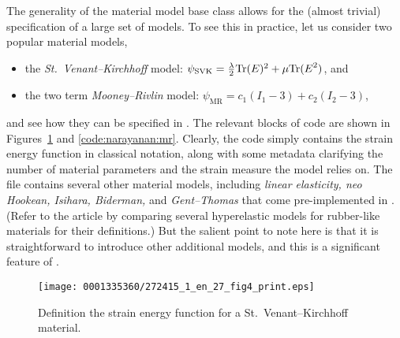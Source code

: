 The generality of the material model base class allows for the (almost
trivial) specification of a large set of models. To see this in
practice, let us consider two popular material models,
\begin{itemize}
  \item the {\em St.~Venant--Kirchhoff} model: $\psi_{\mathrm{SVK}} =
  \frac{\lambda}{2}\mathrm{Tr}(\mbox{$ E$})^{2} + \mu\mathrm{Tr}(\mbox{$ E$}^{2})$, and

  \item the two term {\em Mooney--Rivlin} model: $\psi_{\mathrm{MR}} =
  c_{1} (I_{1} - 3) + c_{2} (I_{2} - 3)$,
\end{itemize}
and see how they can be specified in \twist. The relevant blocks of code
are shown in Figures~\ref{code:narayanan:svk} and \ref{code:narayanan:mr}.
Clearly, the code simply contains the strain energy function
in classical notation, along with some metadata clarifying the number
of material parameters and the strain measure the model relies on. The
file  contains several other material models,
including {\em linear elasticity, neo Hookean, Isihara, Biderman,} and
{\em Gent--Thomas} that come pre-implemented in \twist. (Refer to the
article by \citet{MarckmannVerron2006} comparing several hyperelastic
models for rubber-like materials for their definitions.) But the
salient point to note here is that it is straightforward to introduce
other additional models, and this is a significant feature of \twist.

\makeatletter
\def\img@cmode{\hskip-5pt\begin{turn}{90}\rlap{\kern35\p@\@img@cmode{\@cmodetext}}\end{turn}}
\makeatother

\begin{figure}[!t]
\texttt{[image: 0001335360/272415\_1\_en\_27\_fig4\_print.eps]}
\caption{Definition the strain energy function for a
  St.~Venant--Kirchhoff material.}
\label{code:narayanan:svk}
\end{figure}

\makeatletter
\def\img@cmode{\hskip-5pt\begin{turn}{90}\rlap{\kern1.5\p@\@img@cmode{\@cmodetext}}\end{turn}}
\makeatother

